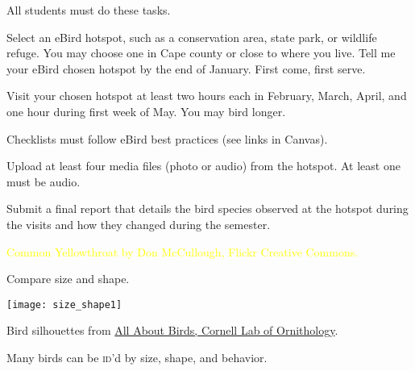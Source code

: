 \documentclass[t]{beamer}
\begin{document}
{
\begin{frame}{All  students must do these tasks.}

\vspace{-\baselineskip}

\hangpara Select an eBird hotspot, such as a conservation area, state park, or wildlife refuge. You may choose one in Cape county or close to where you live. Tell me your eBird chosen hotspot by the end of January. First come, first serve.

\hangpara Visit your chosen hotspot at least two hours each in February, March, April, and one hour during first week of May. You may bird longer.

\hangpara Checklists must follow eBird best practices (see links in Canvas). 


\hangpara Upload at least four media files (photo or audio) from the hotspot. At least one must be audio.

\hangpara Submit a final report that details the bird species observed at the hotspot during the visits and how they changed during the semester. 

\end{frame}
}


{
\begin{frame}[b,plain]
	\tiny\textcolor{yellow}{Common Yellowthroat by Don McCullough, Flickr Creative Commons.}
\end{frame}
}

\begin{frame}[b,plain]{Compare size and shape.}
	\begin{center}
		\texttt{[image: size\_shape1]}
	\end{center}
	\tiny Bird silhouettes from \href{http://allaboutbirds.com}{All About Birds, Cornell Lab of Ornithology}.
\end{frame}


{
\begin{frame}[t,plain]{Many birds can be \textsc{id}'d by size, shape, and behavior.}

	\vfilll
	
	\tiny\hfill{}
\end{frame}
}
\end{document}
